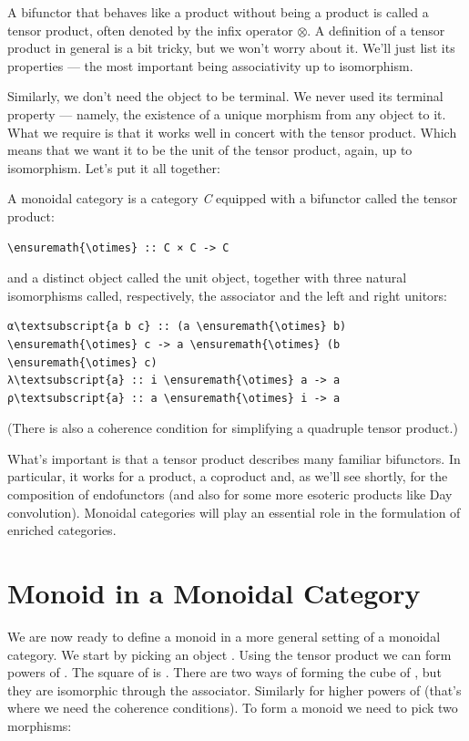 A bifunctor that behaves like a product without being a product is
called a tensor product, often denoted by the infix operator \ensuremath{\otimes}. A
definition of a tensor product in general is a bit tricky, but we won't
worry about it. We'll just list its properties --- the most important
being associativity up to isomorphism.

Similarly, we don't need the object  to be terminal. We never
used its terminal property --- namely, the existence of a unique
morphism from any object to it. What we require is that it works well in
concert with the tensor product. Which means that we want it to be the
unit of the tensor product, again, up to isomorphism. Let's put it all
together:

A monoidal category is a category \emph{C} equipped with a bifunctor
called the tensor product:

\begin{Verbatim}[commandchars=\\\{\}]
\ensuremath{\otimes} :: C × C -> C
\end{Verbatim}
and a distinct object  called the unit object, together with
three natural isomorphisms called, respectively, the associator and the
left and right unitors:

\begin{Verbatim}[commandchars=\\\{\}]
α\textsubscript{a b c} :: (a \ensuremath{\otimes} b) \ensuremath{\otimes} c -> a \ensuremath{\otimes} (b \ensuremath{\otimes} c)
λ\textsubscript{a} :: i \ensuremath{\otimes} a -> a
ρ\textsubscript{a} :: a \ensuremath{\otimes} i -> a
\end{Verbatim}
(There is also a coherence condition for simplifying a quadruple tensor
product.)

What's important is that a tensor product describes many familiar
bifunctors. In particular, it works for a product, a coproduct and, as
we'll see shortly, for the composition of endofunctors (and also for
some more esoteric products like Day convolution). Monoidal categories
will play an essential role in the formulation of enriched categories.

\section{Monoid in a Monoidal
Category}\label{monoid-in-a-monoidal-category}

We are now ready to define a monoid in a more general setting of a
monoidal category. We start by picking an object . Using the
tensor product we can form powers of . The square of
 is . There are two ways of forming the cube
of , but they are isomorphic through the associator. Similarly
for higher powers of  (that's where we need the coherence
conditions). To form a monoid we need to pick two morphisms:

